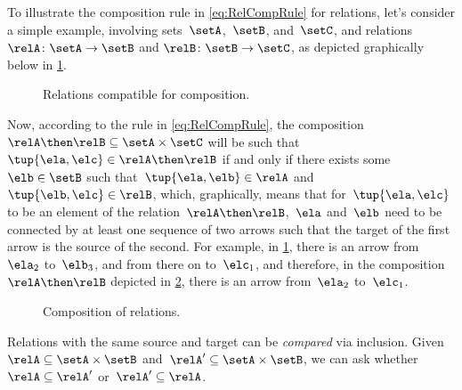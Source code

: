To illustrate the composition rule in \cref{eq:RelCompRule} for relations, let's consider a simple example, involving sets~$\setA$,~$\setB$, and~$\setC$, and relations~$\relA \colon \setA \to \setB$ and $\relB \colon \setB \to \setC$, as depicted graphically below in \cref{fig:example_rel_composable}.
%
\begin{figure}[h!]
  \centering
  \caption{Relations compatible for composition.}
  \label{fig:example_rel_composable}
\end{figure}
%
Now, according to the rule in \cref{eq:RelCompRule}, the composition~$\relA \then \relB \subseteq \setA \times \setC$ will be such that~$\tup{\ela,\elc} \in \relA \then \relB$ if and only if there exists some~$\elb \in \setB$ such that~$\tup{\ela,\elb} \in \relA$ and~$\tup{\elb,\elc} \in \relB$, which, graphically, means that for~$\tup{\ela,\elc}$ to be an element of the relation~$\relA \then \relB$,~$\ela$ and~$\elb$ need to be connected by at least one sequence of two arrows such that the target of the first arrow is the source of the second.
For example, in \cref{fig:example_rel_composable}, there is an arrow from~$\ela_2$ to~$\elb_3$, and from there on to~$\elc_1$, and therefore, in the composition~$\relA \then \relB$ depicted in \cref{fig:example_rel_composed}, there is an arrow from~$\ela_2$ to~$\elc_1$.
%
\begin{figure}[h!]
  \centering
  \caption{Composition of relations.}
  \label{fig:example_rel_composed}
\end{figure}

\begin{remark}
  Relations with the same source and target can be \emph{compared} via inclusion.
  Given~$\relA \subseteq \setA\times \setB$ and~$\relA'\subseteq \setA\times \setB$, we can ask whether~$\relA\subseteq \relA'$ or~$\relA'\subseteq \relA$.
\end{remark}
